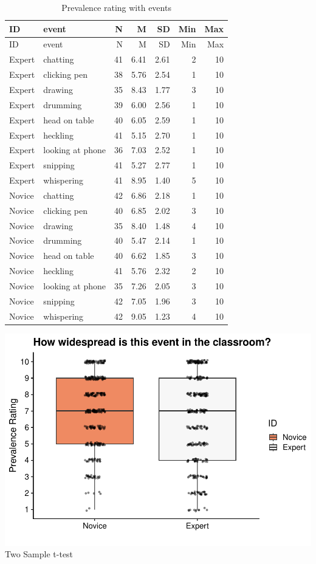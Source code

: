 \documentclass[
]{article}
\begin{document}
\begin{longtable}[]{@{}llrrrrr@{}}
\caption{Prevalence rating with events}\tabularnewline
\toprule\noalign{}
ID & event & N & M & SD & Min & Max \\
\midrule\noalign{}
\endfirsthead
\toprule\noalign{}
ID & event & N & M & SD & Min & Max \\
\midrule\noalign{}
\endhead
\bottomrule\noalign{}
\endlastfoot
Expert & chatting & 41 & 6.41 & 2.61 & 2 & 10 \\
Expert & clicking pen & 38 & 5.76 & 2.54 & 1 & 10 \\
Expert & drawing & 35 & 8.43 & 1.77 & 3 & 10 \\
Expert & drumming & 39 & 6.00 & 2.56 & 1 & 10 \\
Expert & head on table & 40 & 6.05 & 2.59 & 1 & 10 \\
Expert & heckling & 41 & 5.15 & 2.70 & 1 & 10 \\
Expert & looking at phone & 36 & 7.03 & 2.52 & 1 & 10 \\
Expert & snipping & 41 & 5.27 & 2.77 & 1 & 10 \\
Expert & whispering & 41 & 8.95 & 1.40 & 5 & 10 \\
Novice & chatting & 42 & 6.86 & 2.18 & 1 & 10 \\
Novice & clicking pen & 40 & 6.85 & 2.02 & 3 & 10 \\
Novice & drawing & 35 & 8.40 & 1.48 & 4 & 10 \\
Novice & drumming & 40 & 5.47 & 2.14 & 1 & 10 \\
Novice & head on table & 40 & 6.62 & 1.85 & 3 & 10 \\
Novice & heckling & 41 & 5.76 & 2.32 & 2 & 10 \\
Novice & looking at phone & 35 & 7.26 & 2.05 & 3 & 10 \\
Novice & snipping & 42 & 7.05 & 1.96 & 3 & 10 \\
Novice & whispering & 42 & 9.05 & 1.23 & 4 & 10 \\
\end{longtable}

\includegraphics{expertise_2024_09_26_no_outlierdetection_MK_files/figure-latex/sri_pr-1.pdf}
Two Sample t-test
\end{document}
